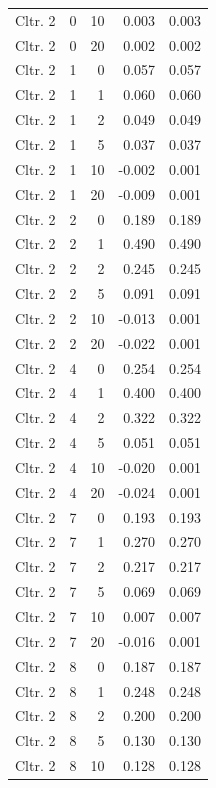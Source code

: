\begin{longtable}{lrrrr}
  Cltr. 2 &    0 &   10 & 0.003 & 0.003 \\ 
  Cltr. 2 &    0 &   20 & 0.002 & 0.002 \\ 
  Cltr. 2 &    1 &    0 & 0.057 & 0.057 \\ 
  Cltr. 2 &    1 &    1 & 0.060 & 0.060 \\ 
  Cltr. 2 &    1 &    2 & 0.049 & 0.049 \\ 
  Cltr. 2 &    1 &    5 & 0.037 & 0.037 \\ 
  Cltr. 2 &    1 &   10 & -0.002 & 0.001 \\ 
  Cltr. 2 &    1 &   20 & -0.009 & 0.001 \\ 
  Cltr. 2 &    2 &    0 & 0.189 & 0.189 \\ 
  Cltr. 2 &    2 &    1 & 0.490 & 0.490 \\ 
  Cltr. 2 &    2 &    2 & 0.245 & 0.245 \\ 
  Cltr. 2 &    2 &    5 & 0.091 & 0.091 \\ 
  Cltr. 2 &    2 &   10 & -0.013 & 0.001 \\ 
  Cltr. 2 &    2 &   20 & -0.022 & 0.001 \\ 
  Cltr. 2 &    4 &    0 & 0.254 & 0.254 \\ 
  Cltr. 2 &    4 &    1 & 0.400 & 0.400 \\ 
  Cltr. 2 &    4 &    2 & 0.322 & 0.322 \\ 
  Cltr. 2 &    4 &    5 & 0.051 & 0.051 \\ 
  Cltr. 2 &    4 &   10 & -0.020 & 0.001 \\ 
  Cltr. 2 &    4 &   20 & -0.024 & 0.001 \\ 
  Cltr. 2 &    7 &    0 & 0.193 & 0.193 \\ 
  Cltr. 2 &    7 &    1 & 0.270 & 0.270 \\ 
  Cltr. 2 &    7 &    2 & 0.217 & 0.217 \\ 
  Cltr. 2 &    7 &    5 & 0.069 & 0.069 \\ 
  Cltr. 2 &    7 &   10 & 0.007 & 0.007 \\ 
  Cltr. 2 &    7 &   20 & -0.016 & 0.001 \\ 
  Cltr. 2 &    8 &    0 & 0.187 & 0.187 \\ 
  Cltr. 2 &    8 &    1 & 0.248 & 0.248 \\ 
  Cltr. 2 &    8 &    2 & 0.200 & 0.200 \\ 
  Cltr. 2 &    8 &    5 & 0.130 & 0.130 \\ 
  Cltr. 2 &    8 &   10 & 0.128 & 0.128 \\ 

\end{longtable}
